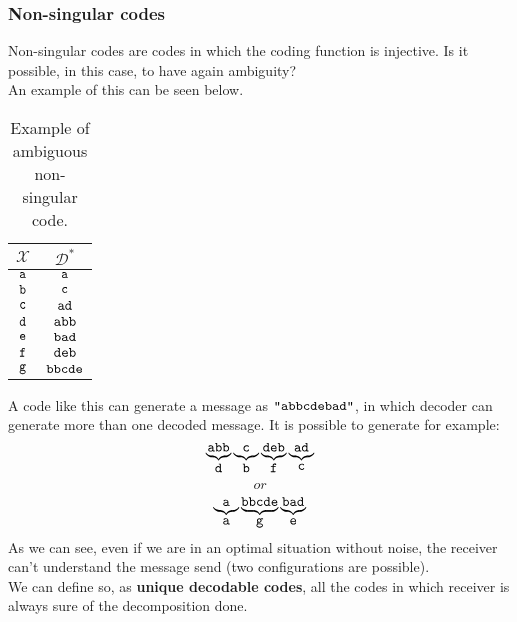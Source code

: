 \subsubsection{Non-singular codes}
Non-singular codes are codes in which the coding function is injective. Is it possible, in this case, to have again ambiguity?\\
An example of this can be seen below.
\begin{table}[H]
	\centering
	\begin{tabular}{| c | c |}
		\hline
		$\mathcal{X}$ & $\mathcal{D}^*$\\\hline
		$\verb|a|$ & $\verb|a|$ \\
		$\verb|b|$ & $\verb|c|$ \\
		$\verb|c|$ & $\verb|ad|$ \\
		$\verb|d|$ & $\verb|abb|$ \\
		$\verb|e|$ & $\verb|bad|$ \\
		$\verb|f|$ & $\verb|deb|$ \\
		$\verb|g|$ & $\verb|bbcde|$ \\
		\hline
	\end{tabular}
	\caption{Example of ambiguous non-singular code.}
\end{table}
\par
A code like this can generate a message as $\verb|"abbcdebad"|$, in which decoder can generate more than one decoded message. It is possible to generate for example:
$$\underbrace{\texttt{abb}}_{\verb|d|}\underbrace{\texttt{c}}_{\verb|b|}\underbrace{\texttt{deb}}_{\verb|f|}\underbrace{\texttt{ad}}_{\verb|c|}$$
$$or$$
$$\underbrace{\texttt{a}}_{\verb|a|}\underbrace{\texttt{bbcde}}_{\verb|g|}\underbrace{\texttt{bad}}_{\verb|e|}$$
As we can see, even if we are in an optimal situation without noise, the receiver can't understand the message send (two configurations are possible).\\
We can define so, as \textbf{unique decodable codes}, all the codes in which receiver is always sure of the decomposition done.

